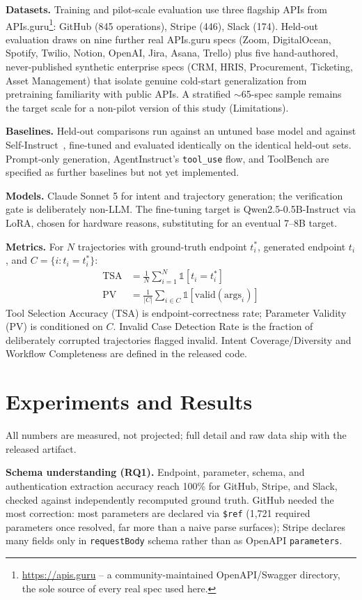 \documentclass[letterpaper]{article} %
\begin{document}
\textbf{Datasets.} Training and pilot-scale evaluation use three flagship APIs from
APIs.guru\footnote{\url{https://apis.guru} -- a community-maintained OpenAPI/Swagger directory,
the sole source of every real spec used here.}: GitHub (845 operations), Stripe (446), Slack (174).
Held-out evaluation draws on nine further real APIs.guru specs (Zoom, DigitalOcean, Spotify,
Twilio, Notion, OpenAI, Jira, Asana, Trello) plus five hand-authored, never-published synthetic
enterprise specs (CRM, HRIS, Procurement, Ticketing, Asset Management) that isolate genuine
cold-start generalization from pretraining familiarity with public APIs. A stratified $\sim$65-spec
sample remains the target scale for a non-pilot version of this study (Limitations).

\textbf{Baselines.} Held-out comparisons run against an untuned base model and against
Self-Instruct~\cite{wang2022selfinstruct}, fine-tuned and evaluated identically on the identical
held-out sets. Prompt-only generation, AgentInstruct's \texttt{tool\_use} flow, and ToolBench are
specified as further baselines but not yet implemented.

\textbf{Models.} Claude Sonnet 5 for intent and trajectory generation; the verification gate is
deliberately non-LLM. The fine-tuning target is Qwen2.5-0.5B-Instruct via LoRA, chosen for
hardware reasons, substituting for an eventual 7--8B target.

\textbf{Metrics.} For $N$ trajectories with ground-truth endpoint $t_i^*$, generated endpoint
$t_i$, and $C=\{i : t_i = t_i^*\}$:
\begin{align*}
\text{TSA} &= \tfrac{1}{N}\textstyle\sum_{i=1}^{N} \mathbb{1}[t_i = t_i^*] \\
\text{PV} &= \tfrac{1}{|C|}\textstyle\sum_{i \in C} \mathbb{1}[\mathrm{valid}(\mathrm{args}_i)]
\end{align*}
Tool Selection Accuracy (TSA) is endpoint-correctness rate; Parameter Validity (PV) is conditioned
on $C$. Invalid Case Detection Rate is the fraction of deliberately corrupted trajectories flagged
invalid. Intent Coverage/Diversity and Workflow Completeness are defined in the released code.

\section{Experiments and Results}
All numbers are measured, not projected; full detail and raw data ship with the released artifact.

\textbf{Schema understanding (RQ1).} Endpoint, parameter, schema, and authentication extraction
accuracy reach 100\% for GitHub, Stripe, and Slack, checked against independently recomputed
ground truth. GitHub needed the most correction: most parameters are declared via \texttt{\$ref}
(1,721 required parameters once resolved, far more than a naive parse surfaces); Stripe declares
many fields only in \texttt{requestBody} schema rather than as OpenAPI \texttt{parameters}.
\end{document}
